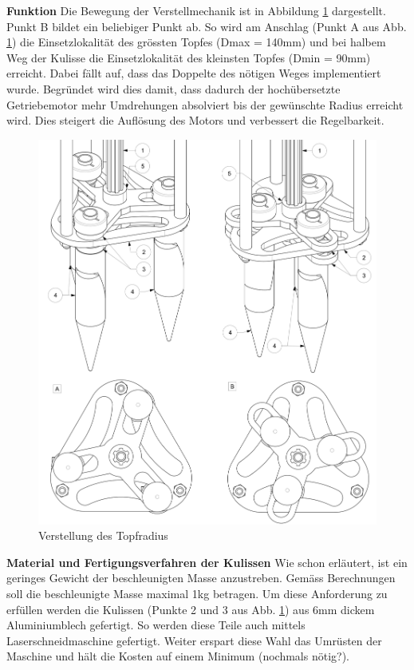 \textbf{Funktion}
\newline
Die Bewegung der Verstellmechanik ist in Abbildung \ref{fig:motion_vm} dargestellt. Punkt B bildet ein beliebiger Punkt ab. So wird am Anschlag (Punkt A aus Abb. \ref{fig:motion_vm}) die Einsetzlokalität des grössten Topfes (Dmax = 140mm) und bei halbem Weg der Kulisse die Einsetzlokalität des kleinsten Topfes (Dmin = 90mm) erreicht. Dabei fällt auf, dass das Doppelte des nötigen Weges implementiert wurde. Begründet wird dies damit, dass dadurch der hochübersetzte Getriebemotor mehr Umdrehungen absolviert bis der gewünschte Radius erreicht wird. Dies steigert die Auflösung des Motors und verbessert die Regelbarkeit.
	\begin{figure}[H]
	\includegraphics[scale=0.53]{Illustrationen/6-Umsetzung/motion_vm.jpg}
	\caption{Verstellung des Topfradius}
	\label{fig:motion_vm}
	\end{figure}
\textbf{Material und Fertigungsverfahren der Kulissen}
\newline
Wie schon erläutert, ist ein geringes Gewicht der beschleunigten Masse anzustreben. Gemäss Berechnungen soll die beschleunigte Masse maximal 1kg betragen. Um diese Anforderung zu erfüllen werden die Kulissen (Punkte 2 und 3 aus Abb. \ref{fig:motion_vm}) aus 6mm dickem Aluminiumblech gefertigt. So werden diese Teile auch mittels Laserschneidmaschine gefertigt. Weiter erspart diese Wahl das Umrüsten der Maschine und hält die Kosten auf einem Minimum (nochmals nötig?).